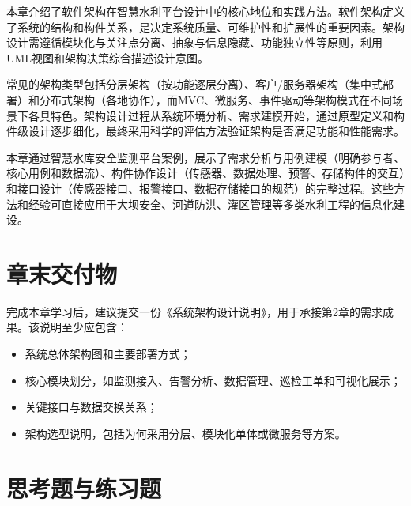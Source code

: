 本章介绍了软件架构在智慧水利平台设计中的核心地位和实践方法。软件架构定义了系统的结构和构件关系，是决定系统质量、可维护性和扩展性的重要因素。架构设计需遵循模块化与关注点分离、抽象与信息隐藏、功能独立性等原则，利用UML视图和架构决策综合描述设计意图。

常见的架构类型包括分层架构（按功能逐层分离）、客户/服务器架构（集中式部署）和分布式架构（各地协作），而MVC、微服务、事件驱动等架构模式在不同场景下各具特色。架构设计过程从系统环境分析、需求建模开始，通过原型定义和构件级设计逐步细化，最终采用科学的评估方法验证架构是否满足功能和性能需求。

本章通过智慧水库安全监测平台案例，展示了需求分析与用例建模（明确参与者、核心用例和数据流）、构件协作设计（传感器、数据处理、预警、存储构件的交互）和接口设计（传感器接口、报警接口、数据存储接口的规范）的完整过程。这些方法和经验可直接应用于大坝安全、河道防洪、灌区管理等多类水利工程的信息化建设。

\section*{章末交付物}

完成本章学习后，建议提交一份《系统架构设计说明》，用于承接第2章的需求成果。该说明至少应包含：

\begin{itemize}
\item 系统总体架构图和主要部署方式；
\item 核心模块划分，如监测接入、告警分析、数据管理、巡检工单和可视化展示；
\item 关键接口与数据交换关系；
\item 架构选型说明，包括为何采用分层、模块化单体或微服务等方案。
\end{itemize}

\section*{思考题与练习题}

